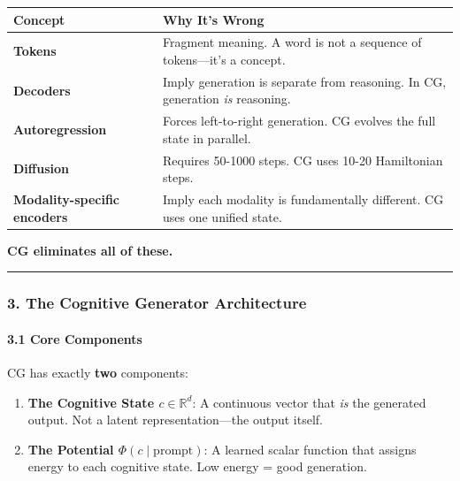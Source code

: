 \documentclass[
  11pt,
  a4paper,
]{article}
\begin{document}
\begin{longtable}[]{@{}
  >{\raggedright\arraybackslash}p{}
  >{\raggedright\arraybackslash}p{}@{}}
\toprule\noalign{}
\begin{minipage}[b]{\linewidth}\raggedright
Concept
\end{minipage} & \begin{minipage}[b]{\linewidth}\raggedright
Why It's Wrong
\end{minipage} \\
\midrule\noalign{}
\endhead
\bottomrule\noalign{}
\endlastfoot
\textbf{Tokens} & Fragment meaning. A word is not a sequence of
tokens---it's a concept. \\
\textbf{Decoders} & Imply generation is separate from reasoning. In CG,
generation \emph{is} reasoning. \\
\textbf{Autoregression} & Forces left-to-right generation. CG evolves
the full state in parallel. \\
\textbf{Diffusion} & Requires 50-1000 steps. CG uses 10-20 Hamiltonian
steps. \\
\textbf{Modality-specific encoders} & Imply each modality is
fundamentally different. CG uses one unified state. \\
\end{longtable}

\textbf{CG eliminates all of these.}

\begin{center}\rule{0.5\linewidth}{0.5pt}\end{center}

\subsubsection{3. The Cognitive Generator
Architecture}\label{the-cognitive-generator-architecture}

\paragraph{3.1 Core Components}\label{core-components}

CG has exactly \textbf{two} components:

\begin{enumerate}
\def\labelenumi{\arabic{enumi}.}
\item
  \textbf{The Cognitive State \(c \in \mathbb{R}^d\)}: A continuous
  vector that \emph{is} the generated output. Not a latent
  representation---the output itself.
\item
  \textbf{The Potential \(\Phi(c \mid \text{prompt})\)}: A learned
  scalar function that assigns energy to each cognitive state. Low
  energy = good generation.
\end{enumerate}
\end{document}
